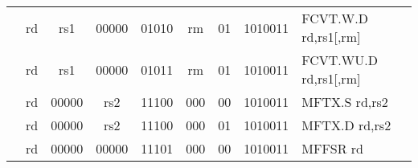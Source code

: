 \begin{table}[p]
\begin{small}
\begin{center}
\begin{tabular}{rccccccccccl}
&
\multicolumn{1}{|c|}{rd} &
\multicolumn{1}{c|}{rs1} &
\multicolumn{1}{c|}{00000} &
\multicolumn{3}{c|}{01010} &
\multicolumn{2}{c|}{rm} &
\multicolumn{1}{c|}{01} &
\multicolumn{1}{c|}{1010011} & FCVT.W.D rd,rs1[,rm] \\
\cline{2-11}
  

&
\multicolumn{1}{|c|}{rd} &
\multicolumn{1}{c|}{rs1} &
\multicolumn{1}{c|}{00000} &
\multicolumn{3}{c|}{01011} &
\multicolumn{2}{c|}{rm} &
\multicolumn{1}{c|}{01} &
\multicolumn{1}{c|}{1010011} & FCVT.WU.D rd,rs1[,rm] \\
\cline{2-11}
  

&
\multicolumn{1}{|c|}{rd} &
\multicolumn{1}{c|}{00000} &
\multicolumn{1}{c|}{rs2} &
\multicolumn{3}{c|}{11100} &
\multicolumn{2}{c|}{000} &
\multicolumn{1}{c|}{00} &
\multicolumn{1}{c|}{1010011} & MFTX.S rd,rs2 \\
\cline{2-11}
  

&
\multicolumn{1}{|c|}{rd} &
\multicolumn{1}{c|}{00000} &
\multicolumn{1}{c|}{rs2} &
\multicolumn{3}{c|}{11100} &
\multicolumn{2}{c|}{000} &
\multicolumn{1}{c|}{01} &
\multicolumn{1}{c|}{1010011} & MFTX.D rd,rs2 \\
\cline{2-11}
  

&
\multicolumn{1}{|c|}{rd} &
\multicolumn{1}{c|}{00000} &
\multicolumn{1}{c|}{00000} &
\multicolumn{3}{c|}{11101} &
\multicolumn{2}{c|}{000} &
\multicolumn{1}{c|}{00} &
\multicolumn{1}{c|}{1010011} & MFFSR rd \\
\cline{2-11}
  

\end{tabular}
\end{center}
\end{small}

\label{instr-table}
\end{table}
  

\newpage

